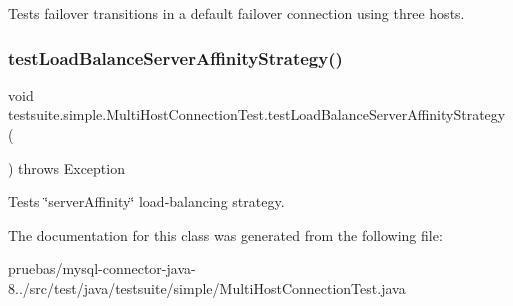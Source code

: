 Tests failover transitions in a default failover connection using three hosts. \mbox{\label{classtestsuite_1_1simple_1_1_multi_host_connection_test_ae9514e6473a1fcd37fc3a964e107f271}} 
\subsubsection{\texorpdfstring{test\+Load\+Balance\+Server\+Affinity\+Strategy()}{testLoadBalanceServerAffinityStrategy()}}
{\footnotesize\ttfamily void testsuite.\+simple.\+Multi\+Host\+Connection\+Test.\+test\+Load\+Balance\+Server\+Affinity\+Strategy (\begin{DoxyParamCaption}{ }\end{DoxyParamCaption}) throws Exception}

Tests \char`\"{}server\+Affinity\char`\"{} load-\/balancing strategy. 

The documentation for this class was generated from the following file\+:\begin{DoxyCompactItemize}
\item 
pruebas/mysql-\/connector-\/java-\/8../src/test/java/testsuite/simple/Multi\+Host\+Connection\+Test.\+java\end{DoxyCompactItemize}
